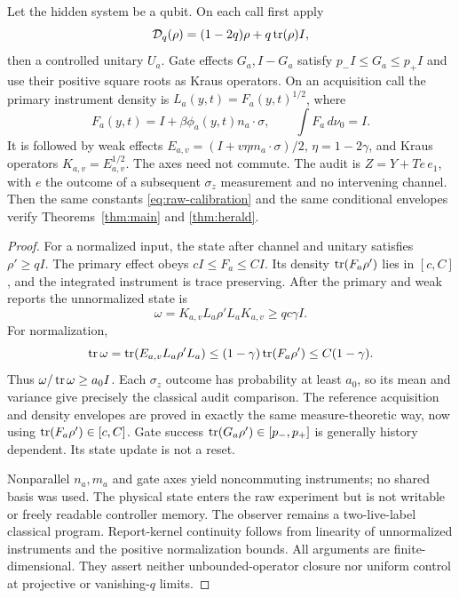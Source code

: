 \begin{theorem}\label{thm:quantum}
Let the hidden system be a qubit. On each call first apply
\[
 \mathcal D_q(\rho)=(1-2q)\rho+q\operatorname{tr}(\rho)I,
\]
then a controlled unitary $U_a$. Gate effects $G_a,I-G_a$ satisfy $p_-I\le G_a\le p_+I$ and use their positive square roots as Kraus operators. On an acquisition call the primary instrument density is $L_a(y,t)=F_a(y,t)^{1/2}$, where
\[
 F_a(y,t)=I+\beta\phi_a(y,t)n_a\cdot\sigma,
 \qquad \int F_a\,d\nu_0=I.
\]
It is followed by weak effects $E_{a,v}=(I+v\eta m_a\cdot\sigma)/2$, $\eta=1-2\gamma$, and Kraus operators $K_{a,v}=E_{a,v}^{1/2}$. The axes need not commute. The audit is $Z=Y+Te\,e_1$, with $e$ the outcome of a subsequent $\sigma_z$ measurement and no intervening channel. Then the same constants \eqref{eq:raw-calibration} and the same conditional envelopes verify Theorems~\ref{thm:main} and \ref{thm:herald}.
\end{theorem}
\begin{proof}
For a normalized input, the state after channel and unitary satisfies $\rho'\ge qI$. The primary effect obeys $cI\le F_a\le CI$. Its density $\operatorname{tr}(F_a\rho')$ lies in $[c,C]$, and the integrated instrument is trace preserving. After the primary and weak reports the unnormalized state is
\[
 \omega=K_{a,v}L_a\rho' L_aK_{a,v}\ge qc\gamma I.
\]
For normalization,
\[
 \operatorname{tr}\omega=\operatorname{tr}(E_{a,v}L_a\rho' L_a)
       \le(1-\gamma)\operatorname{tr}(F_a\rho')\le C(1-\gamma).
\]
Thus $\omega/\operatorname{tr}\omega\ge a_0I$. Each $\sigma_z$ outcome has probability at least $a_0$, so its mean and variance give precisely the classical audit comparison. The reference acquisition and density envelopes are proved in exactly the same measure-theoretic way, now using $\operatorname{tr}(F_a\rho')\in[c,C]$. Gate success $\operatorname{tr}(G_a\rho')\in[p_-,p_+]$ is generally history dependent. Its state update is not a reset.

Nonparallel $n_a,m_a$ and gate axes yield noncommuting instruments; no shared basis was used. The physical state enters the raw experiment but is not writable or freely readable controller memory. The observer remains a two-live-label classical program. Report-kernel continuity follows from linearity of unnormalized instruments and the positive normalization bounds. All arguments are finite-dimensional. They assert neither unbounded-operator closure nor uniform control at projective or vanishing-$q$ limits.
\end{proof}

